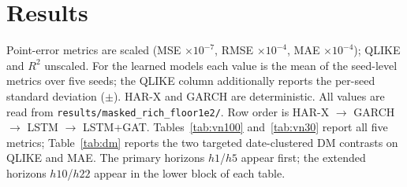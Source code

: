 \documentclass[runningheads]{llncs}
\begin{document}
\section{Results}
Point-error metrics are scaled (MSE $\times10^{-7}$, RMSE $\times10^{-4}$, MAE $\times10^{-4}$); QLIKE and
$R^2$ unscaled. For the learned models each value is the mean of the seed-level metrics over five seeds; the
QLIKE column additionally reports the per-seed standard deviation ($\pm$). HAR-X and GARCH are deterministic.
All values are read from \texttt{results/masked\_rich\_floor1e2/}. Row order is
HAR-X $\to$ GARCH $\to$ LSTM $\to$ LSTM+GAT. Tables~\ref{tab:vn100} and~\ref{tab:vn30} report all five metrics;
Table~\ref{tab:dm} reports the two targeted date-clustered DM contrasts on QLIKE and MAE. The primary horizons
$h1$/$h5$ appear first; the extended horizons $h10$/$h22$ appear in the lower block of each table.

\begin{table}[t]
\centering
\caption{VN100 (46{,}308 masked obs over 454 test dates at $h1$; learned models: seed mean, QLIKE
$\pm$~per-seed std). Lower is better for MSE/RMSE/MAE/QLIKE, higher for $R^2$. $^{\dagger}$~marks metrics where LSTM+GAT improves over the no-graph LSTM. MSE $\times10^{-7}$, RMSE $\times10^{-4}$, MAE $\times10^{-4}$.}
\label{tab:vn100}
\footnotesize
\setlength{\tabcolsep}{5pt}

\end{table}

\begin{table}[t]
\centering
\caption{VN30 (10{,}106 masked obs over 326 test dates at $h1$; learned: seed mean, QLIKE $\pm$~per-seed std). $^{\dagger}$~as in Table~1. Same scaling as
Table~\ref{tab:vn100}.}
\label{tab:vn30}
\footnotesize
\setlength{\tabcolsep}{5pt}

\end{table}
\end{document}
